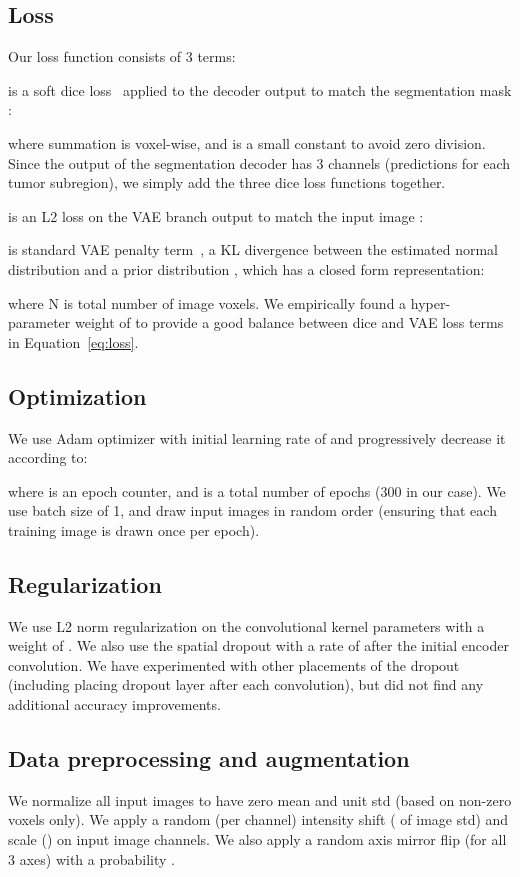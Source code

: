 \documentclass[runningheads]{llncs}
\newcommand{\0}{\ensuremath{\mathbf{0}}}
\newcommand{\1}{\ensuremath{\mathbf{1}}}
\begin{document}
 
 \subsection{Loss}
 Our loss function consists of 3 terms:
  
 is a soft dice loss~\cite{Milletari16} applied to the  decoder output  to match the segmentation mask :
   
where summation is voxel-wise, and  is a small constant to avoid zero division. Since the output of the segmentation decoder has 3 channels (predictions for each tumor subregion), we simply add the three dice loss functions together. 

 is an L2 loss on the VAE branch output  to match the input image :
   
  
  is standard VAE penalty term~\cite{Kingma14,doersch2016vae}, a KL divergence between the estimated normal distribution  and a prior distribution , which has a closed form representation:
 
where N is total number of image voxels. We empirically found a hyper-parameter weight of  to provide a good balance between dice and VAE loss terms in Equation~\ref{eq:loss}.
    
               
  	
 \subsection{Optimization}
 We use Adam optimizer with initial learning rate of  and progressively decrease it according to:
 
 where  is an epoch counter, and  is a total number of epochs (300 in our case). 
 We use batch size of 1, and draw input images in random order (ensuring that each training image is drawn once per epoch). 
 
 \subsection{Regularization}
 We use L2 norm regularization on the convolutional kernel parameters with a weight of .  We also use the spatial dropout with a rate of   after the initial encoder convolution. We have experimented with other placements of the dropout (including placing dropout layer after each convolution), but did not find any additional accuracy improvements. 
 
  \subsection{Data preprocessing and augmentation}
  We normalize all input images to have zero mean and unit std (based on non-zero voxels only). We  apply a random (per channel) intensity  shift (  of image std) and scale () on input image channels.  We also apply a random axis mirror flip (for all 3 axes) with a probability . 
\end{document}
